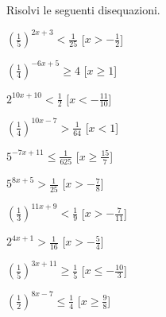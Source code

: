 \begin{esercizio}\label{ese:}
 Risolvi le seguenti disequazioni.
\begin{multicols}{2}
 \begin{enumeratea}
  \item  \(\left(\frac{1}{5}\right)^{2 x +3} < \frac{1}{25}\)
   \hfill [\(x > -\frac{1}{2}\)]
  \item  \(\left(\frac{1}{4}\right)^{-6 x +5} \geqslant 4\)
   \hfill [\(x \geqslant 1\)]
  \item  \(2^{10 x +10} < \frac{1}{2}\)
   \hfill [\(x < -\frac{11}{10}\)]
  \item  \(\left(\frac{1}{4}\right)^{10 x -7} > \frac{1}{64}\)
   \hfill [\(x < 1\)]
  \item  \(5^{-7 x +11} \leqslant \frac{1}{625}\)
   \hfill [\(x \geqslant \frac{15}{7}\)]
  \item  \(5^{8 x +5} > \frac{1}{25}\)
   \hfill [\(x > -\frac{7}{8}\)]
  \item  \(\left(\frac{1}{3}\right)^{11 x +9} < \frac{1}{9}\)
   \hfill [\(x > -\frac{7}{11}\)]
  \item  \(2^{4 x +1} > \frac{1}{16}\)
   \hfill [\(x > -\frac{5}{4}\)]
  \item  \(\left(\frac{1}{5}\right)^{3 x +11} \geqslant \frac{1}{5}\)
   \hfill [\(x \leqslant -\frac{10}{3}\)]
  \item  \(\left(\frac{1}{2}\right)^{8 x -7} \leqslant \frac{1}{4}\)
   \hfill [\(x \geqslant \frac{9}{8}\)]
 \end{enumeratea}
\end{multicols}
\end{esercizio}



